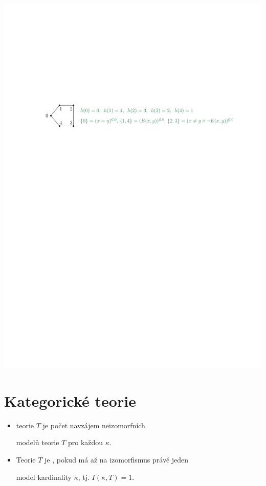     \centerline{\includegraphics[scale=0.75]{files/5cyklus}}
    \smallskip
    
    
    \vspace{-6mm}
    
    

\section{Kategorické teorie}\todo

\begin{itemize}
    \item {} teorie $T$ je počet  navzájem neizomorfních
    \smallskip
    
    modelů teorie $T$ pro každou  $\kappa$.
        \smallskip
    
    \item Teorie $T$ je , pokud má až na izomorfismus právě jeden
    \smallskip
    
    model kardinality $\kappa$, tj. $I(\kappa,T)=1$.
    \end{itemize}
    \medskip
    

